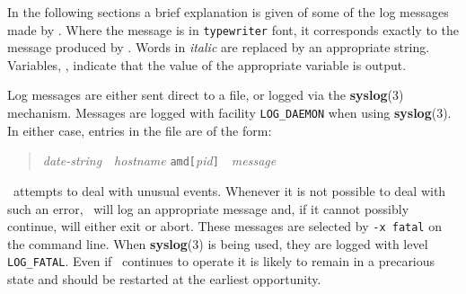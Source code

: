 %
%
%
%




In the following sections a brief explanation is given of some
of the log messages made by \amd.
Where the message is in {\tt typewriter} font, it corresponds
exactly to the message produced by \amd.  Words in {\em italic}
are replaced by an appropriate string.  Variables, ,
indicate that the value of the appropriate variable is output.

Log messages are either sent direct to a file,
or logged via the {\bf syslog}(3) mechanism.
Messages are logged with facility {\tt LOG\_DAEMON} when using {\bf syslog}(3).
In either case, entries in the file are of the form:
\begin{quote}
{\em date-string}\ \ {\em hostname} {\tt amd[}{\em pid}{\tt ]}\ \ {\em message}
\end{quote}

\Amd\ attempts to deal with unusual events.
Whenever it is not possible to deal with such an error, \Amd\ will
log an appropriate message and, if it cannot possibly continue, will
either exit or abort.
These messages are selected by {\tt -x~fatal} on the command line.
When {\bf syslog}(3) is being used, they are logged with
level {\tt LOG\_FATAL}.
Even if \amd\ continues to operate it is likely to remain in a precarious
state and should be restarted at the earliest opportunity.


